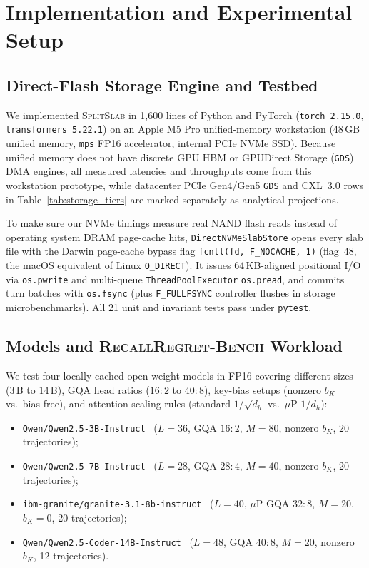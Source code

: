 \documentclass[pdflatex,sn-mathphys-num]{sn-jnl}
\theoremstyle{thmstyleone}
\newcommand{\SplitSlab}{\textsc{SplitSlab}}
\newcommand{\RecallBench}{\textsc{RecallRegret-Bench}}
\begin{document}
\section{Implementation and Experimental Setup}\label{sec:methodology}

\subsection{Direct-Flash Storage Engine and Testbed}
We implemented \SplitSlab{} in 1,600 lines of Python and PyTorch (\texttt{torch 2.15.0}, \texttt{transformers 5.22.1}) on an Apple M5 Pro unified-memory workstation (48\,GB unified memory, \texttt{mps} FP16 accelerator, internal PCIe NVMe SSD). Because unified memory does not have discrete GPU HBM or GPUDirect Storage (\texttt{GDS}) DMA engines, all measured latencies and throughputs come from this workstation prototype, while datacenter PCIe Gen4/Gen5 \texttt{GDS} and CXL~3.0 rows in Table~\ref{tab:storage_tiers} are marked separately as analytical projections.

To make sure our NVMe timings measure real NAND flash reads instead of operating system DRAM page-cache hits, \texttt{DirectNVMeSlabStore} opens every slab file with the Darwin page-cache bypass flag \texttt{fcntl(fd, F\_NOCACHE, 1)} (flag~48, the macOS equivalent of Linux \texttt{O\_DIRECT}). It issues 64\,KB-aligned positional I/O via \texttt{os.pwrite} and multi-queue \texttt{ThreadPoolExecutor} \texttt{os.pread}, and commits turn batches with \texttt{os.fsync} (plus \texttt{F\_FULLFSYNC} controller flushes in storage microbenchmarks). All 21 unit and invariant tests pass under \texttt{pytest}.

\subsection{Models and \RecallBench{} Workload}
We test four locally cached open-weight models in FP16 covering different sizes (3\,B to 14\,B), GQA head ratios ($16{:}2$ to $40{:}8$), key-bias setups (nonzero $b_K$ vs.\ bias-free), and attention scaling rules (standard $1/\sqrt{d_h}$ vs.\ $\mu\text{P}$ $1/d_h$):
\begin{itemize}
  \item \texttt{Qwen/Qwen2.5-3B-Instruct}~\cite{yang2024qwen25} ($L=36$, GQA $16{:}2$, $M=80$, nonzero $b_K$, 20 trajectories);
  \item \texttt{Qwen/Qwen2.5-7B-Instruct}~\cite{yang2024qwen25} ($L=28$, GQA $28{:}4$, $M=40$, nonzero $b_K$, 20 trajectories);
  \item \texttt{ibm-granite/granite-3.1-8b-instruct}~\cite{mishra2024granite} ($L=40$, $\mu\text{P}$ GQA $32{:}8$, $M=20$, $b_K=0$, 20 trajectories);
  \item \texttt{Qwen/Qwen2.5-Coder-14B-Instruct}~\cite{yang2024qwen25} ($L=48$, GQA $40{:}8$, $M=20$, nonzero $b_K$, 12 trajectories).
\end{itemize}
\end{document}
